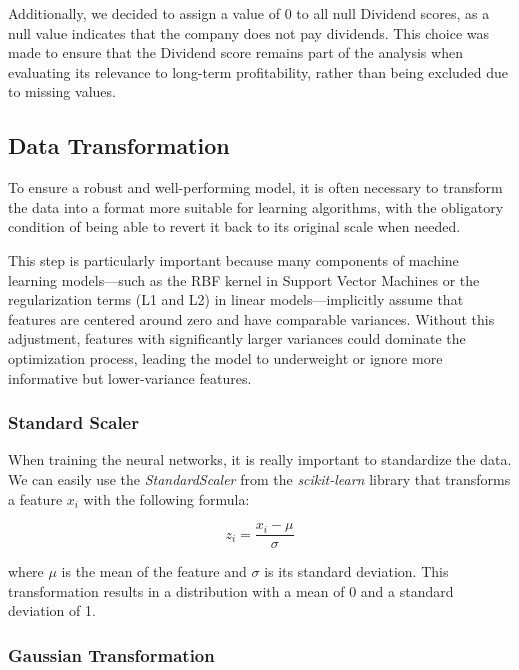 \documentclass[11pt,english,a4paper,hidelinks]{book}
\begin{document}
\vspace{0.5cm}
\noindent Additionally, we decided to assign a value of 0 to all null Dividend scores, as a null value indicates that the company does not pay dividends. This choice was made to ensure that the Dividend score remains part of the analysis when evaluating its relevance to long-term profitability, rather than being excluded due to missing values.


\subsection{Data Transformation}

To ensure a robust and well-performing model, it is often necessary to transform the data into a format more suitable for learning algorithms, with the obligatory condition of being able to revert it back to its original scale when needed. 

\vspace{0.5cm}
\noindent This step is particularly important because many components of machine learning models—such as the RBF kernel in Support Vector Machines or the regularization terms (L1 and L2) in linear models—implicitly assume that features are centered around zero and have comparable variances. Without this adjustment, features with significantly larger variances could dominate the optimization process, leading the model to underweight or ignore more informative but lower-variance features.

\subsubsection{Standard Scaler}
When training the neural networks, it is really important to standardize the data. We can easily use the \textit{StandardScaler} from the \textit{scikit-learn} library that transforms a feature \(x_i\) with the following formula:

\begin{equation}
z_i = \frac{x_i - \mu}{\sigma}
\end{equation}

\noindent where \(\mu\) is the mean of the feature and \(\sigma\) is its standard deviation. This transformation results in a distribution with a mean of 0 and a standard deviation of 1.



\subsubsection{Gaussian Transformation}
\end{document}
